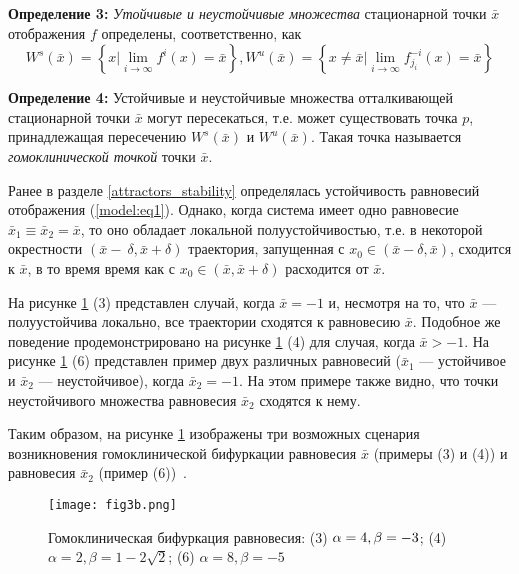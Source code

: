 \documentclass[a4paper, 14pt]{extreport}
\numberwithin{equation}{section}
\numberwithin{figure}{section}
\numberwithin{table}{section}
\begin{document}
			{\bf Определение 3:} {\it Утойчивые и неустойчивые множества} стационарной точки $ \bar{x} $ отображения $ f $ определены, соответственно, как
			\begin{equation}
				W^{s}(\bar{x}) = \left\{ x | \lim_{i \to \infty} f^{i}(x) = \bar{x} \right\}, W^{u}(\bar{x}) = \left\{ x \ne \bar{x}  | \lim_{i \to \infty} f^{-i}_{j_{i}}(x) = \bar{x} \right\}
			\end{equation}

			{\bf Определение 4:} Устойчивые и неустойчивые множества отталкивающей стационарной точки $ \bar{x} $ могут пересекаться, т.е. может существовать точка $ p $, принадлежащая пересечению $ W^{s}(\bar{x}) $ и $ W^{u}(\bar{x}) $. Такая точка называется {\it гомоклинической точкой} точки $ \bar{x} $. %

			Ранее в разделе \ref{attractors_stability} определялась устойчивость равновесий отображения (\ref{model:eq1}). Однако, когда система имеет одно равновесие $ \bar{x}_{1} \equiv \bar{x}_{2} = \bar{x} $, то оно обладает локальной полуустойчивостью, т.е. в некоторой окрестности $ (\bar{x} -~\delta, \bar{x} + \delta) $ траектория, запущенная с $ x_{0} \in (\bar{x} - \delta, \bar{x}) $, сходится к $ \bar{x} $, в то время время как с $ x_{0} \in (\bar{x}, \bar{x} + \delta) $ расходится от $ \bar{x} $. %

			На рисунке \ref{fig3b} (3) представлен случай, когда $ \bar{x} = -1 $ и, несмотря на то, что $ \bar{x} $ --- полуустойчива локально, все траектории сходятся к равновесию $ \bar{x} $. Подобное же поведение продемонстрировано на рисунке \ref{fig3b} (4) для случая, когда $ \bar{x} > -1 $. На рисунке \ref{fig3b} (6) представлен пример двух различных равновесий ($ \bar{x}_{1} $ --- устойчивое и $ \bar{x}_{2} $ --- неустойчивое), когда $ \bar{x}_{2} = -1 $. На этом примере также видно, что точки неустойчивого множества равновесия $ \bar{x}_{2} $ сходятся к нему. %

			Таким образом, на рисунке \ref{fig3b} изображены три возможных сценария возникновения гомоклинической бифуркации равновесия $ \bar{x} $ (примеры (3) и (4)) и равновесия $ \bar{x}_{2} $ (пример (6))~\cite{SushkoGardiniAvrutin2016}. %
			\begin{figure}[h!]
				\begin{center}
					\texttt{[image: fig3b.png]}
				\end{center}
				\caption{Гомоклиническая бифуркация равновесия: (3) $ \alpha = 4,\\ \beta = -3 $; (4) $ \alpha = 2, \beta = 1 - 2 \sqrt{2} $; (6) $ \alpha = 8, \beta = -5 $}
				\label{fig3b}		
			\end{figure}
				
\end{document}
